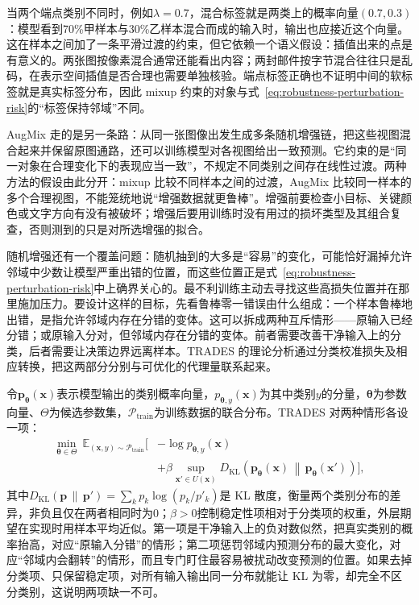 当两个端点类别不同时，例如$\lambda=0.7$，混合标签就是两类上的概率向量$(0.7,0.3)$：模型看到70\%甲样本与30\%乙样本混合而成的输入时，输出也应接近这个向量。这在样本之间加了一条平滑过渡的约束，但它依赖一个语义假设：插值出来的点是有意义的。两张图按像素混合通常还能看出内容；两封邮件按字节混合往往只是乱码，在表示空间插值是否合理也需要单独核验。端点标签正确也不证明中间的软标签就是真实标签分布，因此 mixup 约束的对象与式~\eqref{eq:robustness-perturbation-risk}的“标签保持邻域”不同。

AugMix 走的是另一条路：从同一张图像出发生成多条随机增强链，把这些视图混合起来并保留原图通路，还可以训练模型对各视图给出一致预测。它约束的是“同一对象在合理变化下的表现应当一致”，不规定不同类别之间存在线性过渡。两种方法的假设由此分开：mixup 比较不同样本之间的过渡，AugMix 比较同一样本的多个合理视图，不能笼统地说“增强数据就更鲁棒”。增强前要检查小目标、关键颜色或文字方向有没有被破坏；增强后要用训练时没有用过的损坏类型及其组合复查，否则测到的只是对所选增强的拟合。

随机增强还有一个覆盖问题：随机抽到的大多是“容易”的变化，可能恰好漏掉允许邻域中少数让模型严重出错的位置，而这些位置正是式~\eqref{eq:robustness-perturbation-risk}中上确界关心的。最不利训练主动去寻找这些高损失位置并在那里施加压力。要设计这样的目标，先看鲁棒零一错误由什么组成：一个样本鲁棒地出错，是指允许邻域内存在分错的变体。这可以拆成两种互斥情形——原输入已经分错；或原输入分对，但邻域内存在分错的变体。前者需要改善干净输入上的分类，后者需要让决策边界远离样本。TRADES 的理论分析通过分类校准损失及相应转换，把这两部分分别与可优化的代理量联系起来。

令$\bm{p}_{\bm{\theta}}(\bm{x})$表示模型输出的类别概率向量，$p_{\bm\theta,y}(\bm x)$为其中类别$y$的分量，$\bm{\theta}$为参数向量、$\Theta$为候选参数集，$\mathcal P_{\mathrm{train}}$为训练数据的联合分布。TRADES 对两种情形各设一项：
\begin{equation}
 \begin{aligned}
 \min_{\bm{\theta}\in\Theta}\
 \mathbb E_{(\bm{x},y)\sim\mathcal P_{\mathrm{train}}}
 \bigg[&-\log p_{\bm{\theta},y}(\bm{x})\\
 &+\beta\sup_{\bm{x}'\in U(\bm{x})}
 D_{\mathrm{KL}}\!\left(
 \bm{p}_{\bm{\theta}}(\bm{x})
 \,\middle\|\,
 \bm{p}_{\bm{\theta}}(\bm{x}')\right)\bigg],
 \end{aligned}
 \label{eq:robustness-trades}
\end{equation}
其中$D_{\mathrm{KL}}(\bm p\,\|\,\bm p')=\sum_kp_k\log(p_k/p'_k)$是 KL 散度，衡量两个类别分布的差异，非负且仅在两者相同时为0；$\beta>0$控制稳定性项相对于分类项的权重，外层期望在实现时用样本平均近似。第一项是干净输入上的负对数似然，把真实类别的概率抬高，对应“原输入分错”的情形；第二项惩罚邻域内预测分布的最大变化，对应“邻域内会翻转”的情形，而且专门盯住最容易被扰动改变预测的位置。如果去掉分类项、只保留稳定项，对所有输入输出同一分布就能让 KL 为零，却完全不区分类别，这说明两项缺一不可。

